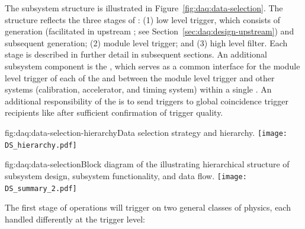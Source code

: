 The  subsystem structure is illustrated in
Figure~\ref{fig:daq:data-selection}. The structure
reflects the three stages of : (1) low level trigger, which consists of
 generation (facilitated in upstream ; see
Section~\ref{sec:daq:design-upstream}) and subsequent
 generation; (2) module level trigger; and (3)
high level filter. Each stage is described in further detail in subsequent
sections. An additional subsystem component is the ,
which serves as a common interface for the
module level trigger of each of the   and between
the module level trigger and other systems (calibration,
accelerator, and timing system) within a single
. An additional responsibility of the
 is to send  triggers
to global coincidence trigger recipients like 
\cite{snews} after sufficient confirmation of trigger quality.

\begin{dunefigure}{fig:daq:data-selection-hierarchy}{Data selection
    strategy and hierarchy.}
 \texttt{[image: DS\_hierarchy.pdf]}
\end{dunefigure}

\begin{dunefigure}{fig:daq:data-selection}{Block diagram of the  
     illustrating hierarchical structure of
    subsystem design, subsystem functionality, and data flow.}
  \texttt{[image: DS\_summary\_2.pdf]}
\end{dunefigure}

The first stage of   operations will trigger on two general
classes of physics, each handled differently at the trigger level:

